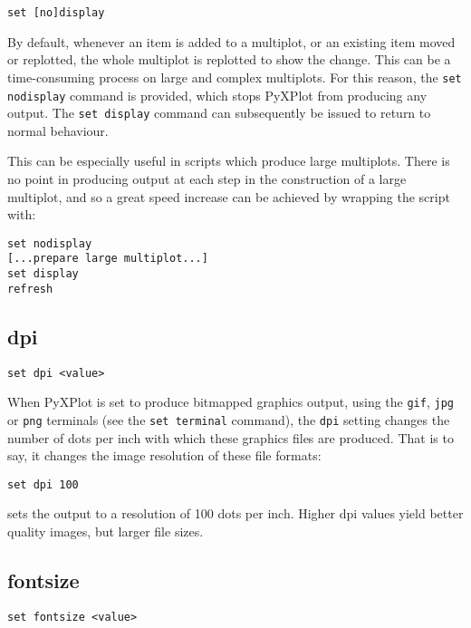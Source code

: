 \begin{verbatim}
set [no]display
\end{verbatim}

By default, whenever an item is added to a multiplot, or an existing item moved
or replotted, the whole multiplot is replotted to show the change. This can be
a time-consuming process on large and complex multiplots. For this reason, the
{\tt set nodisplay} command is provided, which stops PyXPlot from producing any
output. The {\tt set display} command can subsequently be issued to return to
normal behaviour.

This can be especially useful in scripts which produce large multiplots. There
is no point in producing output at each step in the construction of a large
multiplot, and so a great speed increase can be achieved by wrapping the script
with:

\begin{verbatim}
set nodisplay 
[...prepare large multiplot...] 
set display 
refresh
\end{verbatim}


\subsection{dpi}

\begin{verbatim}
set dpi <value>
\end{verbatim}

When PyXPlot is set to produce bitmapped graphics output, using the {\tt gif},
{\tt jpg} or {\tt png} terminals (see the {\tt set terminal} command), the
{\tt dpi} setting changes the number of dots per inch with which these
graphics files are produced. That is to say, it changes the image resolution of
these file formats:

\begin{verbatim}
set dpi 100
\end{verbatim}

\noindent sets the output to a resolution of 100 dots per inch. Higher dpi
values yield better quality images, but larger file sizes.

\subsection{fontsize}

\begin{verbatim}
set fontsize <value>
\end{verbatim}

